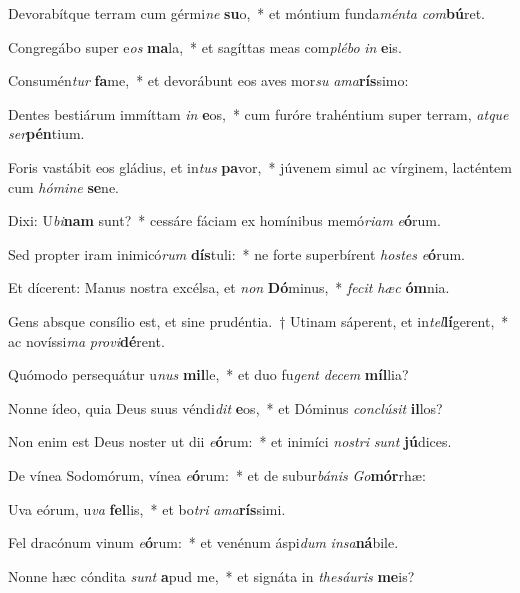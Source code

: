 \item Devorabítque terram cum gérmi\textit{ne} \textbf{su}o,~* et móntium funda\textit{mén}\textit{ta} \textit{com}\textbf{bú}ret.
\item Congregábo super e\textit{os} \textbf{ma}la,~* et sagíttas meas com\textit{plé}\textit{bo} \textit{in} \textbf{e}is.
\item Consumén\textit{tur} \textbf{fa}me,~* et devorábunt eos aves mor\textit{su} \textit{a}\textit{ma}\textbf{rís}simo:
\item Dentes bestiárum immíttam \textit{in} \textbf{e}os,~* cum furóre trahéntium super terram, \textit{at}\textit{que} \textit{ser}\textbf{pén}tium.
\item Foris vastábit eos gládius, et in\textit{tus} \textbf{pa}vor,~* júvenem simul ac vírginem, lacténtem cum \textit{hó}\textit{mi}\textit{ne} \textbf{se}ne.
\item Dixi: U\textit{bi}\textbf{nam} sunt?~* cessáre fáciam ex homínibus memó\textit{ri}\textit{am} \textit{e}\textbf{ó}rum.
\item Sed propter iram inimicó\textit{rum} \textbf{dís}tuli:~* ne forte superbírent \textit{hos}\textit{tes} \textit{e}\textbf{ó}rum.
\item Et dícerent: Manus nostra excélsa, et \textit{non} \textbf{Dó}minus,~* \textit{fe}\textit{cit} \textit{hæc} \textbf{óm}nia.
\item Gens absque consílio est, et sine prudéntia.~† Utinam sáperent, et in\textit{tel}\textbf{lí}gerent,~* ac novíssi\textit{ma} \textit{pro}\textit{vi}\textbf{dé}rent.
\item Quómodo persequátur u\textit{nus} \textbf{mil}le,~* et duo fu\textit{gent} \textit{de}\textit{cem} \textbf{míl}lia?
\item Nonne ídeo, quia Deus suus véndi\textit{dit} \textbf{e}os,~* et Dóminus \textit{con}\textit{clú}\textit{sit} \textbf{il}los?
\item Non enim est Deus noster ut dii \textit{e}\textbf{ó}rum:~* et inimíci \textit{nos}\textit{tri} \textit{sunt} \textbf{jú}dices.
\item De vínea Sodomórum, vínea \textit{e}\textbf{ó}rum:~* et de subur\textit{bá}\textit{nis} \textit{Go}\textbf{mór}rhæ:
\item Uva eórum, u\textit{va} \textbf{fel}lis,~* et bo\textit{tri} \textit{a}\textit{ma}\textbf{rís}simi.
\item Fel dracónum vinum \textit{e}\textbf{ó}rum:~* et venénum áspi\textit{dum} \textit{in}\textit{sa}\textbf{ná}bile.
\item Nonne hæc cóndita \textit{sunt} \textbf{a}pud me,~* et signáta in \textit{the}\textit{sáu}\textit{ris} \textbf{me}is?
